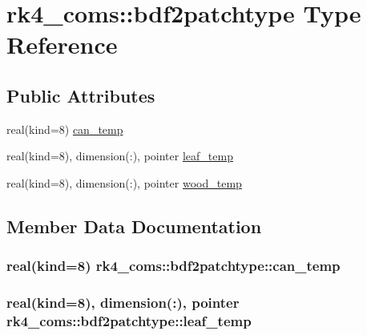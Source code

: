 \hypertarget{structrk4__coms_1_1bdf2patchtype}{}\section{rk4\+\_\+coms\+:\+:bdf2patchtype Type Reference}
\label{structrk4__coms_1_1bdf2patchtype}
\subsection*{Public Attributes}
\begin{DoxyCompactItemize}
\item 
real(kind=8) \hyperlink{structrk4__coms_1_1bdf2patchtype_aec0aed9409122068c64242b3110a943d}{can\+\_\+temp}
\item 
real(kind=8), dimension(\+:), pointer \hyperlink{structrk4__coms_1_1bdf2patchtype_a3bfd89d8aeb7e32b951eb9a8cb16f61e}{leaf\+\_\+temp}
\item 
real(kind=8), dimension(\+:), pointer \hyperlink{structrk4__coms_1_1bdf2patchtype_a760e813763073c0ebbcc9768d2d85b92}{wood\+\_\+temp}
\end{DoxyCompactItemize}


\subsection{Member Data Documentation}
\subsubsection[{\texorpdfstring{can\+\_\+temp}{can_temp}}]{\setlength{\rightskip}{0pt plus 5cm}real(kind=8) rk4\+\_\+coms\+::bdf2patchtype\+::can\+\_\+temp}\hypertarget{structrk4__coms_1_1bdf2patchtype_aec0aed9409122068c64242b3110a943d}{}\label{structrk4__coms_1_1bdf2patchtype_aec0aed9409122068c64242b3110a943d}
\subsubsection[{\texorpdfstring{leaf\+\_\+temp}{leaf_temp}}]{\setlength{\rightskip}{0pt plus 5cm}real(kind=8), dimension(\+:), pointer rk4\+\_\+coms\+::bdf2patchtype\+::leaf\+\_\+temp}\hypertarget{structrk4__coms_1_1bdf2patchtype_a3bfd89d8aeb7e32b951eb9a8cb16f61e}{}\label{structrk4__coms_1_1bdf2patchtype_a3bfd89d8aeb7e32b951eb9a8cb16f61e}
